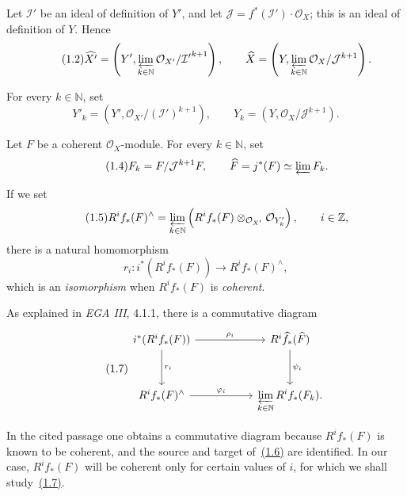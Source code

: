 \documentclass[11pt,a4paper,oneside]{book}
\theoremstyle{plain}
\theoremstyle{definition}
\theoremstyle{remark}
\begin{document}
Let $\mathcal I'$ be an ideal of definition of $Y'$, and let
$\mathcal J=f^*(\mathcal I')\cdot\mathcal O_X$; this is an ideal of
definition of $Y$. Hence
\begin{equation}
\tag{1.2}\label{eq:IX.1.2}
\widehat{X'}=
\left(Y',\varprojlim_{k\in\mathbb N}
\mathcal O_{X'}/{\mathcal I'}^{k+1}\right),
\qquad
\widehat X=
\left(Y,\varprojlim_{k\in\mathbb N}
\mathcal O_X/\mathcal J^{k+1}\right).
\end{equation}

For every $k\in\mathbb N$, set
\begin{equation}
\tag{1.3}\label{eq:IX.1.3}
Y'_k=\left(Y',\mathcal O_{X'}/(\mathcal I')^{k+1}\right),
\qquad
Y_k=\left(Y,\mathcal O_X/\mathcal J^{k+1}\right).
\end{equation}

Let $F$ be a coherent $\mathcal O_X$-module. For every $k\in\mathbb N$, set
\begin{equation}
\tag{1.4}\label{eq:IX.1.4}
F_k=F/\mathcal J^{k+1}F,
\qquad
\widehat F=j^*(F)\simeq\varprojlim F_k.
\end{equation}

If we set
\begin{equation}
\tag{1.5}\label{eq:IX.1.5}
R^i f_*(F)^{\wedge}
=\varprojlim_{k\in\mathbb N}
\left(R^i f_*(F)\otimes_{\mathcal O_{X'}}\mathcal O_{Y'_k}\right),
\qquad i\in\mathbb Z,
\end{equation}
there is a natural homomorphism
\begin{equation}
\tag{1.6}\label{eq:IX.1.6}
r_i:i^*(R^i f_*(F))\longrightarrow R^i f_*(F)^{\wedge},
\end{equation}
which is an \emph{isomorphism} when $R^i f_*(F)$ is \emph{coherent}.

As explained in \emph{EGA III}, 4.1.1, there is a commutative diagram
\begin{equation}
\tag{1.7}\label{eq:IX.1.7}
\begin{tikzcd}[column sep=5.2em,row sep=3.2em]
i^*(R^i f_*(F))
  \arrow[r,"\rho_i"]
  \arrow[d,"r_i"]
& R^i\widehat f_*(\widehat F)
  \arrow[d,"\psi_i"] \\
R^i f_*(F)^{\wedge}
  \arrow[r,"\varphi_i"]
& \displaystyle\varprojlim_{k\in\mathbb N} R^i f_*(F_k).
\end{tikzcd}
\end{equation}

In the cited passage one obtains a commutative diagram because
$R^i f_*(F)$ is known to be coherent, and the source and target of~\hyperref[eq:IX.1.6]{(1.6)}
are identified. In our case, $R^i f_*(F)$ will be coherent only for certain
values of $i$, for which we shall study~\hyperref[eq:IX.1.7]{(1.7)}.
\end{document}
